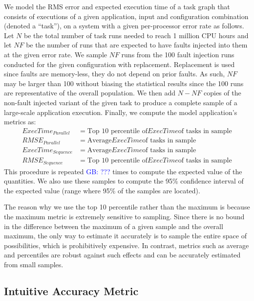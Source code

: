 \documentclass[10pt, conference, compsocconf]{IEEEtran}
\newcommand{\greg}[1]{%
  \textcolor{blue}{GB: #1}
}
\begin{document}
We model the RMS error and expected execution time of a task graph that consists of executions of a given application, input and configuration combination (denoted a ``task''), on a system with a given per-processor error rate as follows.
Let $N$ be the total number of task runs needed to reach 1 million CPU hours and let $NF$ be the number of runs that are expected to have faults injected into them at the given error rate.
We sample $NF$ runs from the 100 fault injection runs conducted for the given configuration with replacement.
Replacement is used since faults are memory-less, they do not depend on prior faults.
As such, $NF$ may be larger than 100 without biasing the statistical results since the 100 runs are representative of the overall population.
We then add $N-NF$ copies of the non-fault injected variant of the given task to produce a complete sample of a large-scale application execution.
Finally, we compute the model application's metrics as:
\begin{eqnarray}
ExecTime_{Parallel} &= \text{Top 10 percentile of} ExecTime \text{of tasks in sample}\\
RMSE_{Parallel} &= \text{Average} ExecTime \text{of tasks in sample}\\
ExecTime_{Sequence} & = \text{Average} ExecTime \text{of tasks in sample}\\
RMSE_{Sequence} & = \text{Top 10 percentile of} ExecTime \text{of tasks in sample}
\end{eqnarray}
This procedure is repeated \greg{???} times to compute the expected value of the quantities.
We also use these samples to compute the 95\% confidence interval of the expected value (range where 95\% of the samples are located).

The reason why we use the top 10 percentile rather than the maximum is because the maximum metric is extremely sensitive to sampling.
Since there is no bound in the difference between the maximum of a given sample and the overall maximum, the only way to estimate it accurately is to sample the entire space of possibilities, which is prohibitively expensive.
In contrast, metrics such as average and percentiles are robust against such effects and can be accurately estimated from small samples.

\subsection{Intuitive Accuracy Metric}
\label{sec:eval:errorsensitivity}
\end{document}
